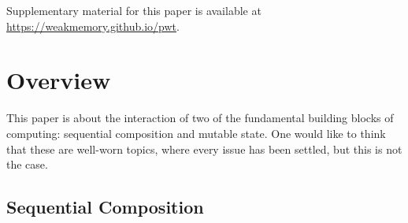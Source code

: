
Supplementary material for this paper is available at
\url{https://weakmemory.github.io/pwt}.

\section{Overview}
\label{sec:overview}

This paper is about the interaction of two of the fundamental building blocks
of computing: sequential composition and mutable state. One would like to
think that these are well-worn topics, where every issue has been settled,
but this is not the case.

\subsection{Sequential Composition} %

